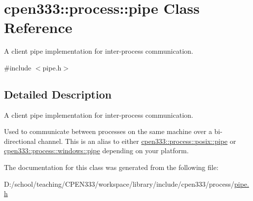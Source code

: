 \hypertarget{classcpen333_1_1process_1_1pipe}{}\section{cpen333\+:\+:process\+:\+:pipe Class Reference}
\label{classcpen333_1_1process_1_1pipe}


A client pipe implementation for inter-\/process communication.  




{\ttfamily \#include $<$pipe.\+h$>$}



\subsection{Detailed Description}
A client pipe implementation for inter-\/process communication. 

Used to communicate between processes on the same machine over a bi-\/directional channel. This is an alias to either \hyperlink{classcpen333_1_1process_1_1posix_1_1pipe}{cpen333\+::process\+::posix\+::pipe} or \hyperlink{classcpen333_1_1process_1_1windows_1_1pipe}{cpen333\+::process\+::windows\+::pipe} depending on your platform. 

The documentation for this class was generated from the following file\+:\begin{DoxyCompactItemize}
\item 
D\+:/school/teaching/\+C\+P\+E\+N333/workspace/library/include/cpen333/process/\hyperlink{pipe_8h}{pipe.\+h}\end{DoxyCompactItemize}
